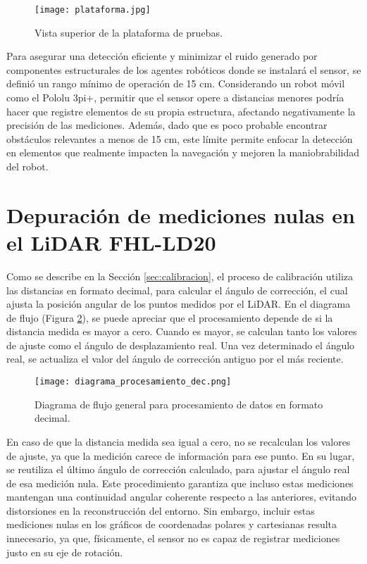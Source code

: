 \begin{figure}[H]
	\centering
	\texttt{[image: plataforma.jpg]}
	\caption{Vista superior de la plataforma de pruebas.}
	\label{fig:plataforma_fisica}
\end{figure}

Para asegurar una detección eficiente y minimizar el ruido generado por componentes estructurales de los agentes robóticos donde se instalará el sensor, se definió un rango mínimo de operación de 15 cm. Considerando un robot móvil como el Pololu 3pi+, permitir que el sensor opere a distancias menores podría hacer que registre elementos de su propia estructura, afectando negativamente la precisión de las mediciones. Además, dado que es poco probable encontrar obstáculos relevantes a menos de 15 cm, este límite permite enfocar la detección en elementos que realmente impacten la navegación y mejoren la maniobrabilidad del robot.

\section{Depuración de mediciones nulas en el LiDAR FHL-LD20}
Como se describe en la Sección \ref{sec:calibracion}, el proceso de calibración utiliza las distancias en formato decimal, para calcular el ángulo de corrección, el cual ajusta la posición angular de los puntos medidos por el LiDAR. En el diagrama de flujo (Figura \ref{fig:diagrama_procesamiento_dec}), se puede apreciar que el procesamiento depende de si la distancia medida es mayor a cero. Cuando es mayor, se calculan tanto los valores de ajuste como el ángulo de desplazamiento real. Una vez determinado el ángulo real, se actualiza el valor del ángulo de corrección antiguo por el más reciente.

\begin{figure}[H]
	\centering
	\texttt{[image: diagrama\_procesamiento\_dec.png]}
	\caption{Diagrama de flujo general para procesamiento de datos en formato decimal.}
	\label{fig:diagrama_procesamiento_dec}
\end{figure}

En caso de que la distancia medida sea igual a cero, no se recalculan los valores de ajuste, ya que la medición carece de información para ese punto. En su lugar, se reutiliza el último ángulo de corrección calculado, para ajustar el ángulo real de esa medición nula. Este procedimiento garantiza que incluso estas mediciones mantengan una continuidad angular coherente respecto a las anteriores, evitando distorsiones en la reconstrucción del entorno. Sin embargo, incluir estas mediciones nulas en los gráficos de coordenadas polares y cartesianas resulta innecesario, ya que, físicamente, el sensor no es capaz de registrar mediciones justo en su eje de rotación. 

